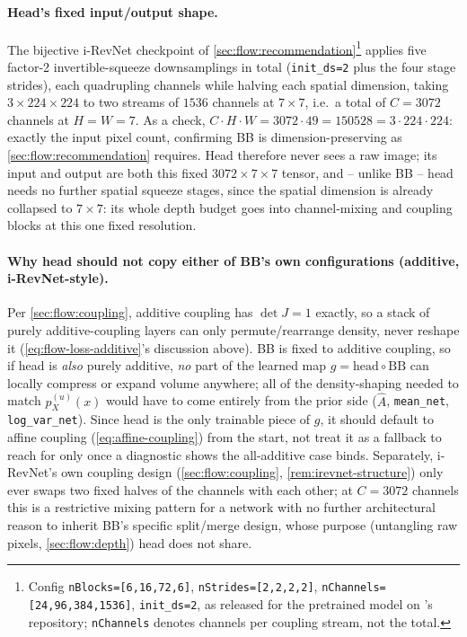 \paragraph{Head's fixed input/output shape.} The bijective i-RevNet checkpoint of
\cref{sec:flow:recommendation}\footnote{Config \texttt{nBlocks=[6,16,72,6]}, \texttt{nStrides=[2,2,2,2]},
\texttt{nChannels=[24,96,384,1536]}, \texttt{init\_ds=2}, as released for the pretrained model on
\cite{jacobsen2018}'s repository; \texttt{nChannels} denotes channels per coupling stream, not the total.}
applies five factor-2 invertible-squeeze downsamplings in total (\texttt{init\_ds=2} plus the four stage
strides), each quadrupling channels while halving each spatial dimension, taking $3\times224\times224$ to
two streams of $1536$ channels at $7\times7$, i.e.\ a total of $C=3072$ channels at $H=W=7$. As a check,
$C\cdot H\cdot W=3072\cdot49=150528=3\cdot224\cdot224$: exactly the input pixel count, confirming BB is
dimension-preserving as \cref{sec:flow:recommendation} requires. Head therefore never sees a raw image;
its input and output are both this fixed $3072\times7\times7$ tensor, and -- unlike BB -- head needs no
further spatial squeeze stages, since the spatial dimension is already collapsed to $7\times7$: its whole
depth budget goes into channel-mixing and coupling blocks at this one fixed resolution.

\paragraph{Why head should not copy either of BB's own configurations (additive, i-RevNet-style).}
Per \cref{sec:flow:coupling}, additive coupling has $\det J=1$ exactly, so a stack of purely
additive-coupling layers can only permute/rearrange density, never reshape it
(\cref{eq:flow-loss-additive}'s discussion above). BB is fixed to additive coupling, so if head is
\emph{also} purely additive, \emph{no} part of the learned map $g=\mathrm{head}\circ\mathrm{BB}$ can locally
compress or expand volume anywhere; all of the density-shaping needed to match $p_X^{(u)}(x)$ would have to
come entirely from the prior side ($\hat A$, \texttt{mean\_net}, \texttt{log\_var\_net}). Since head is the
only trainable piece of $g$, it should default to affine coupling (\cref{eq:affine-coupling}) from the
start, not treat it as a fallback to reach for only once a diagnostic shows the all-additive case binds.
Separately, i-RevNet's own coupling design (\cref{sec:flow:coupling}, \cref{rem:irevnet-structure}) only
ever swaps two fixed halves of the channels with each other; at $C=3072$ channels this is a restrictive
mixing pattern for a network with no further architectural reason to inherit BB's specific split/merge
design, whose purpose (untangling raw pixels, \cref{sec:flow:depth}) head does not share.

